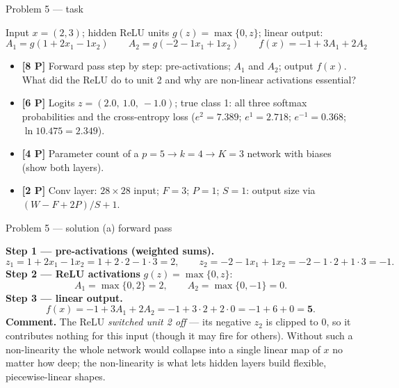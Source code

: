 \documentclass[aspectratio=169,11pt]{beamer}
\begin{document}
\begin{frame}{Problem 5 --- task}
  \begin{exercise}
    Input $x=(2{,}3)$; hidden ReLU units $g(z)=\max\{0{,}z\}$; linear output:
    \[
      A_1=g(1+2x_1-1x_2)\qquad A_2=g(-2-1x_1+1x_2)\qquad f(x)=-1+3A_1+2A_2
    \]
    \begin{itemize}
      \item[(a)] \textbf{[8 P]} Forward pass step by step: pre-activations; $A_1$ and $A_2$;
        output $f(x)$. What did the ReLU do to unit 2 and why are non-linear activations essential?
      \item[(b)] \textbf{[6 P]} Logits $z=(2.0{,}\ 1.0{,}\ -1.0)$; true class 1: all three softmax
        probabilities and the cross-entropy loss
        ($e^{2}=7.389$; $e^{1}=2.718$; $e^{-1}=0.368$; $\ln 10.475=2.349$).
      \item[(c)] \textbf{[4 P]} Parameter count of a $p=5\to k=4\to K=3$ network with biases
        (show both layers).
      \item[(d)] \textbf{[2 P]} Conv layer: $28\times 28$ input; $F=3$; $P=1$; $S=1$:
        output size via $(W-F+2P)/S+1$.
    \end{itemize}
  \end{exercise}
  \vspace{2pt}{\scriptsize\itshape Lecture slides: Chapter 10 --- Deep Learning (Lecture 11).}
\end{frame}

\begin{frame}{Problem 5 --- solution (a) forward pass}
  \begin{solutionbox}
    \textbf{Step 1 --- pre-activations (weighted sums).}
    \[
      z_1=1+2x_1-1x_2=1+2\cdot2-1\cdot3=2,\qquad
      z_2=-2-1x_1+1x_2=-2-1\cdot2+1\cdot3=-1 .
    \]
    \textbf{Step 2 --- ReLU activations} $g(z)=\max\{0,z\}$:
    \[
      A_1=\max\{0,2\}=2,\qquad A_2=\max\{0,-1\}=0 .
    \]
    \textbf{Step 3 --- linear output.}
    \[
      f(x)=-1+3A_1+2A_2=-1+3\cdot2+2\cdot0=-1+6+0=\mathbf{5}.
    \]
    \textbf{Comment.} The ReLU \emph{switched unit 2 off} --- its negative $z_2$ is clipped to
    $0$, so it contributes nothing for this input (though it may fire for others). Without such a
    non-linearity the whole network would collapse into a single linear map of $x$ no matter how
    deep; the non-linearity is what lets hidden layers build flexible, piecewise-linear shapes.
  \end{solutionbox}
\end{frame}
\end{document}

